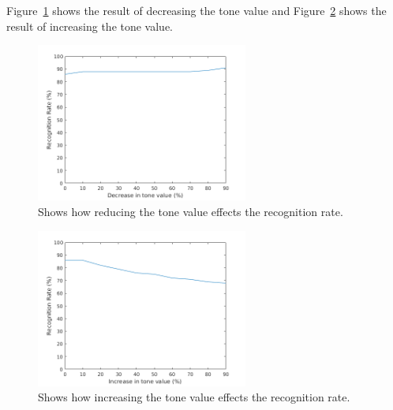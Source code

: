 Figure~\ref{fig:fr_result_plots_down} shows the result of decreasing the tone value and Figure~\ref{fig:fr_result_plots_up} shows the result of increasing the tone value.

\begin{figure}[H]
\centering
\includegraphics[width=0.62\textwidth]{img/blur_test/tone_down_plot.png}
\caption{Shows how reducing the tone value effects the recognition rate.}
\label{fig:fr_result_plots_down}
\end{figure}

\begin{figure}[H]
\centering
\includegraphics[width=0.62\textwidth]{img/blur_test/tone_up_plot.png}
\caption{Shows how increasing the tone value effects the recognition rate.}
\label{fig:fr_result_plots_up}
\end{figure}
